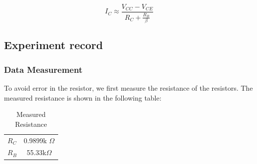         \begin{equation}
            I_C \approx \frac{V_{CC} - V_{CE}}{R_C + \frac{R_B}{\beta}}
            \label{eq:4.5}
        \end{equation}



\subsection{Experiment record}
    \subsubsection{Data Measurement}
    To avoid error in the resistor, we first measure the resistance of the resistors. The measured resistance is shown in the following table:
    \begin{table}[H]
        \centering
        \begin{tabular}{l|c}
            \hline
            $R_C$ & 0.9899k $\Omega$\\
            $R_B$ & 55.33k$\Omega$\\
            \hline
        \end{tabular}
        \caption{Measured Resistance}
        \label{tab:4.1}
    \end{table}\par

